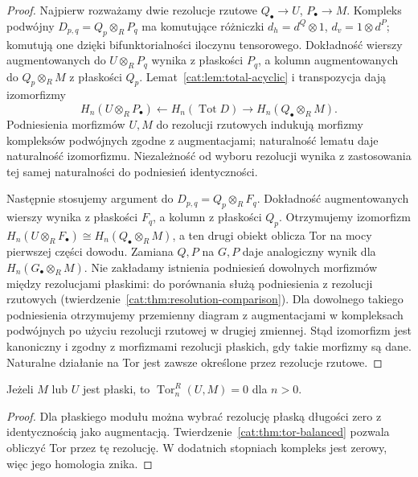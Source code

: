 \begin{proof}
Najpierw rozważamy dwie rezolucje rzutowe $Q_\bullet\to U$, $P_\bullet\to M$. Kompleks podwójny $D_{p,q}=Q_p\otimes_R P_q$ ma komutujące różniczki $d_h=d^Q\otimes1$, $d_v=1\otimes d^P$; komutują one dzięki bifunktorialności iloczynu tensorowego. Dokładność wierszy augmentowanych do $U\otimes_R P_q$ wynika z płaskości $P_q$, a kolumn augmentowanych do $Q_p\otimes_R M$ z płaskości $Q_p$. Lemat~\ref{cat:lem:total-acyclic} i transpozycja dają izomorfizmy
\[
 H_n(U\otimes_R P_\bullet)
 \longleftarrow H_n(\operatorname{Tot}D)
 \longrightarrow H_n(Q_\bullet\otimes_R M).
\]
Podniesienia morfizmów $U,M$ do rezolucji rzutowych indukują morfizmy kompleksów podwójnych zgodne z augmentacjami; naturalność lematu daje naturalność izomorfizmu. Niezależność od wyboru rezolucji wynika z zastosowania tej samej naturalności do podniesień identyczności.

Następnie stosujemy argument do $D_{p,q}=Q_p\otimes_R F_q$. Dokładność augmentowanych wierszy wynika z płaskości $F_q$, a kolumn z płaskości $Q_p$. Otrzymujemy izomorfizm $H_n(U\otimes_R F_\bullet)\cong H_n(Q_\bullet\otimes_R M)$, a ten drugi obiekt oblicza Tor na mocy pierwszej części dowodu. Zamiana $Q,P$ na $G,P$ daje analogiczny wynik dla $H_n(G_\bullet\otimes_R M)$. Nie zakładamy istnienia podniesień dowolnych morfizmów między rezolucjami płaskimi: do porównania służą podniesienia z rezolucji rzutowych (twierdzenie~\ref{cat:thm:resolution-comparison}). Dla dowolnego takiego podniesienia otrzymujemy przemienny diagram z augmentacjami w kompleksach podwójnych po użyciu rezolucji rzutowej w drugiej zmiennej. Stąd izomorfizm jest kanoniczny i zgodny z morfizmami rezolucji płaskich, gdy takie morfizmy są dane. Naturalne działanie na Tor jest zawsze określone przez rezolucje rzutowe.
\end{proof}
\begin{wniosek}\label{cat:cor:tor-flat}
Jeżeli $M$ lub $U$ jest płaski, to $\operatorname{Tor}_n^R(U,M)=0$ dla $n>0$.
\end{wniosek}
\begin{proof}
Dla płaskiego modułu można wybrać rezolucję płaską długości zero z identycznością jako augmentacją. Twierdzenie~\ref{cat:thm:tor-balanced} pozwala obliczyć Tor przez tę rezolucję. W dodatnich stopniach kompleks jest zerowy, więc jego homologia znika.
\end{proof}

